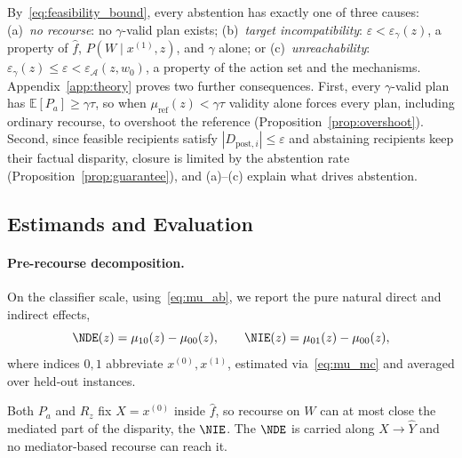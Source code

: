 By~\eqref{eq:feasibility_bound}, every abstention has exactly one of three
causes:
(a)~\emph{no recourse}: no $\gamma$-valid plan exists;
(b)~\emph{target incompatibility}: $\varepsilon<\varepsilon_\gamma(z)$, a
property of $\hat f$, $P(W\mid x^{(1)},z)$, and $\gamma$ alone; or
(c)~\emph{unreachability}: $\varepsilon_\gamma(z)\le\varepsilon<
\varepsilon_{\mathcal A}(z,w_0)$, a property of the action set and the
mechanisms.
Appendix~\ref{app:theory} proves two further consequences. First, every
$\gamma$-valid plan has $\mathbb E[P_a]\ge\gamma\tau$, so when
$\mu_{\mathrm{ref}}(z)<\gamma\tau$ validity alone forces every plan, including
ordinary recourse, to overshoot the reference
(Proposition~\ref{prop:overshoot}). Second, since feasible recipients satisfy
$|D_{\mathrm{post},i}|\le\varepsilon$ and abstaining recipients keep their
factual disparity, closure is limited by the abstention rate
(Proposition~\ref{prop:guarantee}), and (a)--(c) explain what drives
abstention.

\subsection{Estimands and Evaluation}
\label{sec:evaluation}

\paragraph{Pre-recourse decomposition.}
On the classifier scale, using~\eqref{eq:mu_ab}, we report the pure natural
direct and indirect effects,
\begin{equation}
  \NDE(z)=\mu_{10}(z)-\mu_{00}(z),\qquad
  \NIE(z)=\mu_{01}(z)-\mu_{00}(z),
  \label{eq:effects}
\end{equation}
where indices $0,1$ abbreviate $x^{(0)},x^{(1)}$, estimated
via~\eqref{eq:mu_mc} and averaged over held-out instances.

Both $P_a$ and $R_z$ fix $X=x^{(0)}$ inside $\hat f$, so recourse on $W$ can at
most close the mediated part of the disparity, the $\NIE$. The $\NDE$ is
carried along $X\to\hat Y$ and no mediator-based recourse can reach it.

